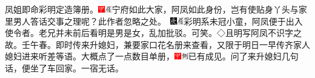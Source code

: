 凤姐即命彩明定造簿册。{{\includegraphics[width=3mm]{../Images/00002}\includegraphics[width=3mm]{../Images/00010}\footnotesize \kaishu 宁府如此大家，阿凤如此身份，岂有使贴身丫头与家里男人答话交事之理呢？此作者忽略之处。　}\includegraphics[width=3mm]{../Images/00004}\includegraphics[width=3mm]{../Images/00010}\footnotesize \kaishu 彩明系未冠小童，阿凤便于出入使令者。老兄并未前后看明是男是女，乱加批驳。可笑。◇{且明写阿凤不识字之故。壬午春。}}即时传来升媳妇，兼要家口花名册来查看，又限于明日一早传齐家人媳妇进来听差等语。大概点了一点数目单册，{\includegraphics[width=3mm]{../Images/00002}\includegraphics[width=3mm]{../Images/00011}\footnotesize \kaishu 已有成见。}问了来升媳妇几句话，便坐了车回家。一宿无话。

